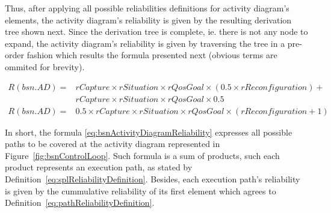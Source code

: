 \begin{center}
\end{center}


Thus, after applying all possible reliabilities definitions for activity
diagram's elements, the activity
diagram's reliability is given by the resulting derivation tree shown next.
Since the derivation tree is complete, ie. there is not any node to expand, the activity diagram's reliability is given by traversing the tree in a pre-order fashion which results the formula presented next (obvious terms are ommited for brevity). 

\begin{equation}
\begin{aligned}\label{eq:bsnActivityDiagramReliability} 
	R(bsn.AD) = & rCapture \times rSituation \times rQosGoal \times (0.5
	                       \times rReconfiguration) + \\ 
		    & rCapture \times rSituation \times rQosGoal \times 0.5\\
	R(bsn.AD) = & 0.5 \times rCapture \times rSituation \times rQosGoal
	\times (rReconfiguration + 1)
\end{aligned}
\end{equation} 

In short, the formula \ref{eq:bsnActivityDiagramReliability} expresses all
possible paths to be covered at the activity diagram represented in
Figure~\ref{fig:bsnControlLoop}. Such formula is a sum of products, such each
product represents an execution path, as stated by
Definition~\ref{eq:splReliabilityDefinition}. Besides, each execution path's
reliability is given by the cummulative reliability of its first element which
agrees to Definition~\ref{eq:pathReliabilityDefinition}.



